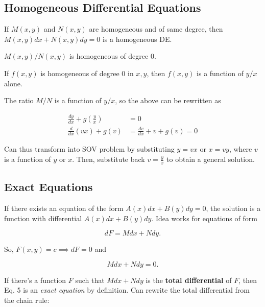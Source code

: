 \subsection{Homogeneous Differential Equations}

\begin{corollary}
    If $M(x,y)$ and $N(x,y)$ are homogeneous and of same degree, then $M(x,y)dx+N(x,y)dy=0$
    is a homogeneous DE.
\end{corollary}
    
\begin{corollary}
    $M(x,y)/N(x,y)$ is homogeneous of degree 0.
\end{corollary}

\begin{corollary}
    If $f(x,y)$ is homogeneous of degree 0 in $x,y$, then $f(x,y)$ is a function of $y/x$ alone.
\end{corollary}

The ratio $M/N$ is a function of $y/x$, so the above can be rewritten as

\begin{align}
    \frac{dy}{dx}+g(\frac{y}{x})&=0\\
    \frac{d}{dx}(vx)+g(v)&=\frac{dv}{dx}+v+g(v)=0
\end{align}
    
Can thus transform into SOV problem by substituting $y=vx$ or $x=vy$, where $v$ is a function of $y$ or $x$.
Then, substitute back $v=\frac{y}{x}$ to obtain a general solution.

\subsection{Exact Equations}

If there exists an equation of the form $A(x)dx+B(y)dy=0$, the solution is a function with differential $A(x)dx+B(y)dy$.
Idea works for equations of form

\begin{equation}
    dF=Mdx+Ndy.
\end{equation}

So, $F(x,y)=c\implies dF=0$ and

\begin{equation}
    Mdx+Ndy=0.
\end{equation}

If there's a function $F$ such that $Mdx+Ndy$ is the \textbf{total differential}
of $F$, then Eq. 5 is an \textit{exact equation} by definition. Can rewrite the total differential from the chain rule:

